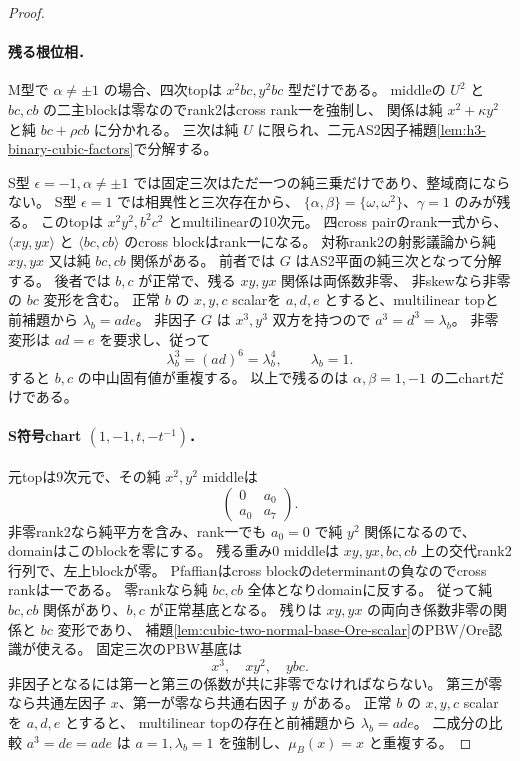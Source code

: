\begin{proof}
\paragraph{残る根位相．}
M型で $\alpha\ne\pm1$ の場合、四次topは $x^2bc,y^2bc$ 型だけである。
middleの $U^2$ と $bc,cb$ の二主blockは零なのでrank2はcross rank一を強制し、
関係は純 $x^2+\kappa y^2$ と純 $bc+\rho cb$ に分かれる。
三次は純 $U$ に限られ、二元AS2因子補題\ref{lem:h3-binary-cubic-factors}で分解する。

S型 $\epsilon=-1,\alpha\ne\pm1$ では固定三次はただ一つの純三乗だけであり、整域商にならない。
S型 $\epsilon=1$ では相異性と三次存在から、
$\{\alpha,\beta\}=\{\omega,\omega^2\}$、$\gamma=1$ のみが残る。
このtopは $x^2y^2,b^2c^2$ とmultilinearの10次元。
四cross pairのrank一式から、$\langle xy,yx\rangle$ と $\langle bc,cb\rangle$ のcross blockはrank一になる。
対称rank2の射影議論から純 $xy,yx$ 又は純 $bc,cb$ 関係がある。
前者では $G$ はAS2平面の純三次となって分解する。
後者では $b,c$ が正常で、残る $xy,yx$ 関係は両係数非零、
非skewなら非零の $bc$ 変形を含む。
正常 $b$ の $x,y,c$ scalarを $a,d,e$ とすると、multilinear topと前補題から
$\lambda_b=ade$。
非因子 $G$ は $x^3,y^3$ 双方を持つので $a^3=d^3=\lambda_b$。
非零変形は $ad=e$ を要求し、従って
\[
 \lambda_b^3=(ad)^6=\lambda_b^4,\qquad \lambda_b=1.
\]
すると $b,c$ の中山固有値が重複する。
以上で残るのは $\alpha,\beta=1,-1$ の二chartだけである。

\paragraph{S符号chart $(1,-1,t,-t^{-1})$．}
元topは9次元で、その純 $x^2,y^2$ middleは
\[
 \begin{pmatrix}0&a_0\\a_0&a_7\end{pmatrix}.
\]
非零rank2なら純平方を含み、rank一でも $a_0=0$ で純 $y^2$ 関係になるので、domainはこのblockを零にする。
残る重み0 middleは $xy,yx,bc,cb$ 上の交代rank2行列で、左上blockが零。
Pfaffianはcross blockのdeterminantの負なのでcross rankは一である。
零rankなら純 $bc,cb$ 全体となりdomainに反する。
従って純 $bc,cb$ 関係があり、$b,c$ が正常基底となる。
残りは $xy,yx$ の両向き係数非零の関係と $bc$ 変形であり、
補題\ref{lem:cubic-two-normal-base-Ore-scalar}のPBW/Ore認識が使える。
固定三次のPBW基底は
\[
 x^3,\quad xy^2,\quad ybc.
\]
非因子となるには第一と第三の係数が共に非零でなければならない。
第三が零なら共通左因子 $x$、第一が零なら共通右因子 $y$ がある。
正常 $b$ の $x,y,c$ scalarを $a,d,e$ とすると、
multilinear topの存在と前補題から $\lambda_b=ade$。
二成分の比較 $a^3=de=ade$ は $a=1,\lambda_b=1$ を強制し、$\mu_B(x)=x$ と重複する。


\end{proof}
